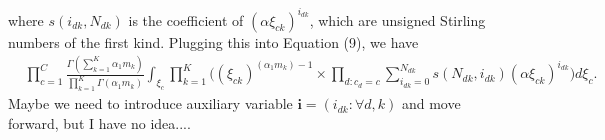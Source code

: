 \documentclass[12pt]{article}
\begin{document}
where $s(i_{dk}, N_{dk})$ is the coefficient of $(\alpha\xi_{ck})^{i_{dk}}$, which are unsigned Stirling numbers of the first kind. Plugging this into Equation (9), we have
\begin{equation}
\begin{aligned}
& \prod_{c=1}^C\frac{\Gamma(\sum_{k=1}^K \alpha_1 m_{k})}{\prod_{k=1}^K\Gamma(\alpha_1 m_{k})}\int_{{\xi}_c} \prod_{k=1}^K \Big((\xi_{ck})^{(\alpha_1 m_k)-1} \times  \prod_{d:c_d = c} \sum_{i_{dk}=0}^{N_{dk}} s(N_{dk}, i_{dk}) (\alpha\xi_{ck})^{i_{dk}}\Big) d\xi_c.
\end{aligned}
\end{equation}
Maybe we need to introduce auxiliary variable $\boldsymbol{i} = (i_{dk}: \forall d, k)$ and move forward, but I have no idea....
\end{document}
